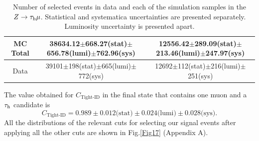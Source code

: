 \begin{table}[H]
{\begin{tabular}{ccc}
		\multicolumn{1}{c|}{MC Total}   & \multicolumn{1}{c|}{38634.12$\pm$668.27(stat)$\pm$656.78(lumi)$\pm$762.96(sys)}                         & 12556.42$\pm$289.09(stat)$\pm$213.46(lumi)$\pm$247.97(sys) \\ \hline
		\multicolumn{1}{c|}{Data}    & \multicolumn{1}{c|}{39101$\pm$198(stat)$\pm$665(lumi)$\pm$772(sys)}                               & 12692$\pm$112(stat)$\pm$216(lumi)$\pm$251(sys)      \\ \hline
	\end{tabular}
	}
	\caption{Number of selected events in data and each of the simulation samples in the $Z\to\tau_\text{h}\mu$. Statistical and systematica uncertainties are presented separately. Luminosity uncertainty is presented apart.}
	\label{Table6}
\end{table}
The value obtained for $C_{\text{Tight-ID}}$ in the final state that contains one muon and a $\tau_\text{h}$ candidate is
\begin{equation}
C_{\text{Tight-ID}}=0.989\pm 0.012\text{(stat)}\pm 0.024\text{(lumi)}\pm 0.028\text{(sys)}.
\end{equation}
All the distributions of the relevant cuts for selecting our signal events after applying all the other cuts are shown in Fig.\ref{Fig17} (Appendix A).
